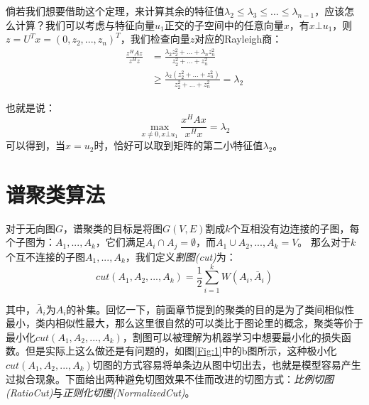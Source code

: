 \documentclass[UTF8, 12pt]{ctexart}
\begin{document}
倘若我们想要借助这个定理，来计算其余的特征值${\lambda _2} \le {\lambda _3} \le ... \le {\lambda _{n-1}}$，应该怎么计算？我们可以考虑与特征向量$u_{1}$正交的子空间中的任意向量$x$，有$x \bot {u_1}$，则$z = U^{T} x = (0, z_{2}, ..., z_{n})^{T}$，我们检查向量$z$对应的Rayleigh商：
\begin{align}
	\frac{{{z^H}Az}}{{{z^H}z}} & = \frac{{{\lambda _2}z_2^2 + ... + {\lambda _n}z_n^2}}{{z_2^2 + ... + z_n^2}}\\
							   & { \ge \frac{{{\lambda _2}(z_2^2 + ... + z_n^2)}}{{z_2^2 + ... + z_n^2}} = {\lambda _2}}
\end{align}

也就是说：
\begin{equation}
\mathop {\max }\limits_{x \ne 0,x \bot {u_1}} \frac{{{x^H}Ax}}{{{x^H}x}} = {\lambda _2}
\end{equation}
可以得到，当$x = u_2$时，恰好可以取到矩阵的第二小特征值$\lambda_{2}$。
\section{谱聚类算法}
对于无向图$G$，谱聚类的目标是将图$G(V,E)$割成$k$个互相没有边连接的子图，每个子图为：$A_1,...,A_k$，它们满足${A_i} \cap {A_j} = \emptyset$，而${A_1} \cup {A_2},...,{A_k} = V$。
那么对于$k$个互不连接的子图$A_1,...,A_k$，我们定义\emph{割图(cut)}为：
\begin{equation}
cut({A_1},{A_2},...,{A_k}) = \frac{1}{2}\sum\limits_{i = 1}^k {W({A_i},{{\bar A}_i})}
\label{objectFcn}
\end{equation}

其中，${{{\bar A}_i}}$为$A_i$的补集。回忆一下，前面章节提到的聚类的目的是为了类间相似性最小，类内相似性最大，那么这里很自然的可以类比于图论里的概念，聚类等价于最小化$cut({A_1},{A_2},...,{A_k})$，割图可以被理解为机器学习中想要最小化的损失函数。但是实际上这么做还是有问题的，如图\ref{Fig:1}中的b图所示，这种极小化$cut({A_1},{A_2},...,{A_k})$切图的方式容易将单条边从图中切出去，也就是模型容易产生过拟合现象。下面给出两种避免切图效果不佳而改进的切图方式：\emph{比例切图(RatioCut)}与\emph{正则化切图(NormalizedCut)}。
\end{document}
